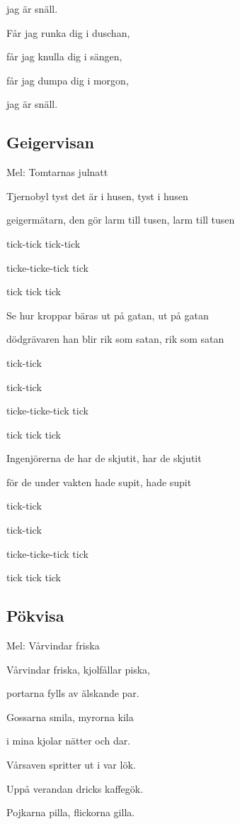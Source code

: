 jag är snäll.

Får jag runka dig i duschan,

får jag knulla dig i sängen,

får jag dumpa dig i morgon,

jag är snäll. 

\subsection{\textbf{Geigervisan }}

Mel: Tomtarnas julnatt\bigskip

Tjernobyl tyst det är i husen, tyst i husen

geigermätarn, den gör larm till tusen, larm till tusen

tick-tick tick-tick

ticke-ticke-tick tick

tick tick tick\bigskip


Se hur kroppar bäras ut på gatan, ut på gatan

dödgrävaren han blir rik som satan, rik som satan

tick-tick

tick-tick

ticke-ticke-tick tick

tick tick tick\bigskip


Ingenjörerna de har de skjutit, har de skjutit

för de under vakten hade supit, hade supit

tick-tick

tick-tick

ticke-ticke-tick tick

tick tick tick 

\subsection{\textbf{Pökvisa}}

Mel: Vårvindar friska\bigskip


Vårvindar friska, kjolfållar piska,

portarna fylls av älskande par.

Gossarna smila, myrorna kila

i mina kjolar nätter och dar.

Vårsaven spritter ut i var lök.

Uppå verandan dricks kaffegök.

Pojkarna pilla, flickorna gilla.

